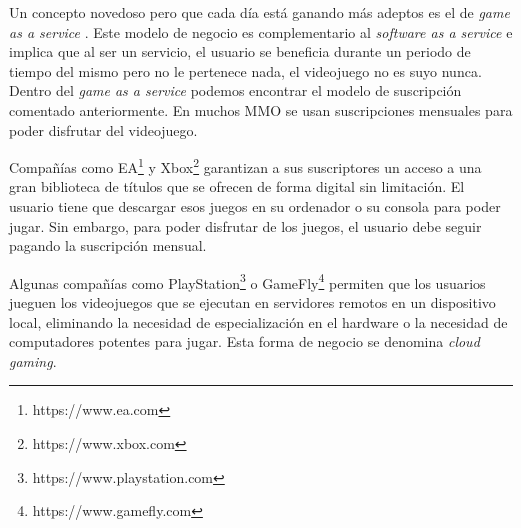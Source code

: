 Un concepto novedoso pero que cada día está ganando más adeptos es el de \textit{game as a service} \cite{11}. Este modelo de negocio es complementario al \textit{software as a service} e implica que al ser un servicio, el usuario se beneficia durante un periodo de tiempo del mismo pero no le pertenece nada, el videojuego no es suyo nunca. Dentro del \textit{game as a service} podemos encontrar el modelo de suscripción comentado anteriormente. En muchos \ac{MMO} se usan suscripciones mensuales para poder disfrutar del videojuego.

Compañías como EA\footnote{https://www.ea.com} y Xbox\footnote{https://www.xbox.com} garantizan a sus suscriptores un acceso a una gran biblioteca de títulos que se ofrecen de forma digital sin limitación. El usuario tiene que descargar esos juegos en su ordenador o su consola para poder jugar. Sin embargo, para poder disfrutar de los juegos, el usuario debe seguir pagando la suscripción mensual.

Algunas compañías como PlayStation\footnote{https://www.playstation.com} o GameFly\footnote{https://www.gamefly.com} permiten que los usuarios jueguen los videojuegos que se ejecutan en servidores remotos en un dispositivo local, eliminando la necesidad de especialización en el hardware o la necesidad de computadores potentes para jugar. Esta forma de negocio se denomina \textit{cloud gaming}.












